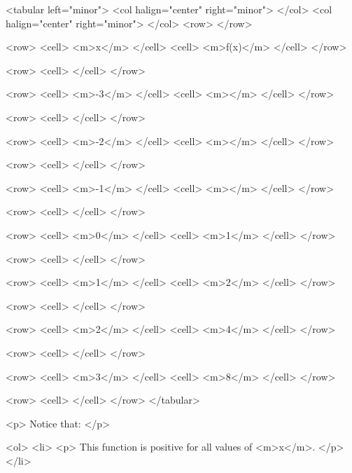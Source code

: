         <tabular left="minor">
            <col halign="center" right="minor"> </col> <col halign="center" right="minor"> </col>
            <row>
            </row>

            <row>
                <cell> <m>x</m> </cell>
                <cell> <m>f(x)</m> </cell>
            </row>

            <row>
                <cell> </cell>
            </row>

            <row>
                <cell> <m>-3</m> </cell>
                <cell> <m></m> </cell>
            </row>

            <row>
                <cell> </cell>
            </row>

            <row>
                <cell> <m>-2</m> </cell>
                <cell> <m></m> </cell>
            </row>

            <row>
                <cell> </cell>
            </row>

            <row>
                <cell> <m>-1</m> </cell>
                <cell> <m></m> </cell>
            </row>

            <row>
                <cell> </cell>
            </row>

            <row>
                <cell> <m>0</m> </cell>
                <cell> <m>1</m> </cell>
            </row>

            <row>
                <cell> </cell>
            </row>

            <row>
                <cell> <m>1</m> </cell>
                <cell> <m>2</m> </cell>
            </row>

            <row>
                <cell> </cell>
            </row>

            <row>
                <cell> <m>2</m> </cell>
                <cell> <m>4</m> </cell>
            </row>

            <row>
                <cell> </cell>
            </row>

            <row>
                <cell> <m>3</m> </cell>
                <cell> <m>8</m> </cell>
            </row>

            <row>
                <cell> </cell>
            </row>
        </tabular>

        <p>
            Notice that:
        </p>

        <ol>
            <li>
                <p>
                    This function is positive for all values of <m>x</m>.
                </p>
            </li>

